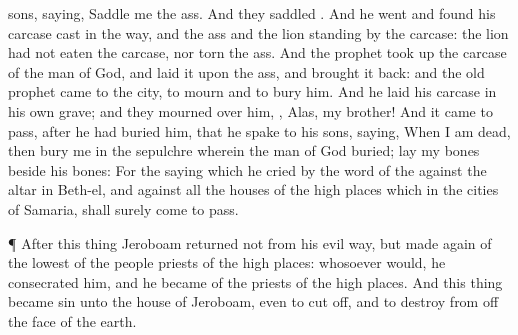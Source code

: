 {sons,
saying,
Saddle me the
ass. And they
saddled
{}.
And he
went and
found his
carcase
cast in the
way, and the
ass and the
lion
standing
by the
carcase: the
lion had not
eaten the
carcase, nor
torn the
ass.
And the
prophet took
up the
carcase of the
man of
God, and
laid it upon the
ass, and brought it
back: and the
old
prophet
came to the
city, to
mourn and to
bury him.
And he
laid his
carcase in his own
grave; and they
mourned over him,
{},
Alas, my
brother!
And it came to pass,
after he had
buried him, that he
spake to his
sons,
saying, When I am
dead, then
bury me in the
sepulchre wherein the
man of
God
{}
buried;
lay my
bones
beside his
bones:
For the
saying which he
cried by the
word of the
{} against the
altar in
Beth-el, and against all the
houses of the high
places which
{} in the
cities of
Samaria, shall surely come to pass.
\par }{\PP {}¶
After this
thing
Jeroboam
returned not from his
evil
way, but
made
again of the
lowest of the
people
priests of the high
places: whosoever
would, he
consecrated him, and he became
{} of the
priests of the high
places.
And this
thing became
sin unto the
house of
Jeroboam, even to cut
{}
off, and to
destroy
{} from off the
face of the
earth.

}

